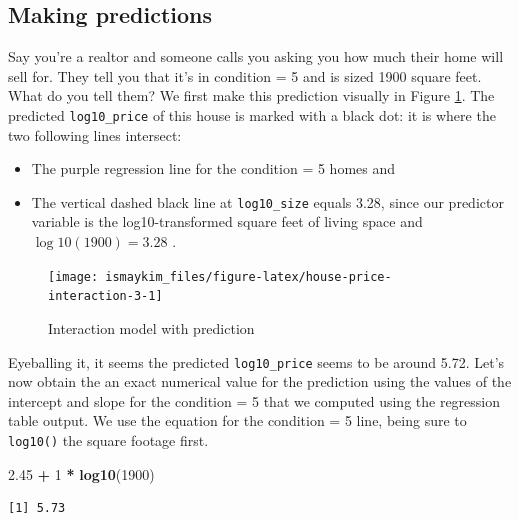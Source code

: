 \documentclass[12pt,]{krantz}
\makeatletter
\newenvironment{Shaded}{\begin{snugshade}}{\end{snugshade}}
\newcommand{\KeywordTok}[1]{\textcolor[rgb]{0.27,0.27,0.27}{\textbf{#1}}}
\newcommand{\DecValTok}[1]{\textcolor[rgb]{0.06,0.06,0.06}{#1}}
\newcommand{\FloatTok}[1]{\textcolor[rgb]{0.06,0.06,0.06}{#1}}
\newcommand{\StringTok}[1]{\textcolor[rgb]{0.5,0.5,0.5}{#1}}
\newcommand{\OperatorTok}[1]{\textcolor[rgb]{0.43,0.43,0.43}{\textbf{#1}}}
\newcommand{\NormalTok}[1]{#1}
\providecommand{\tightlist}{%
  \setlength{\itemsep}{0pt}\setlength{\parskip}{0pt}}
\newenvironment{kframe}{%
\medskip{}
\setlength{\fboxsep}{.8em}
 \def\at@end@of@kframe{}%
 \ifinner\ifhmode%
  \def\at@end@of@kframe{\end{minipage}}%
  \begin{minipage}{\columnwidth}%
 \fi\fi%
 \def\FrameCommand##1{\hskip\@totalleftmargin \hskip-\fboxsep
 \colorbox{shadecolor}{##1}\hskip-\fboxsep
     \hskip-\linewidth \hskip-\@totalleftmargin \hskip\columnwidth}%
 \MakeFramed {\advance\hsize-\width
   \@totalleftmargin\z@ \linewidth\hsize
   \@setminipage}}%
 {\par\unskip\endMakeFramed%
 \at@end@of@kframe}
\renewenvironment{Shaded}{\begin{kframe}}{\end{kframe}}
\theoremstyle{definition}
\theoremstyle{definition}
\theoremstyle{definition}
\theoremstyle{remark}
\makeatother
\begin{document}
\subsection{Making predictions}\label{house-prices-making-predictions}

Say you're a realtor and someone calls you asking you how much their
home will sell for. They tell you that it's in condition = 5 and is
sized 1900 square feet. What do you tell them? We first make this
prediction visually in Figure \ref{fig:house-price-interaction-3}. The
predicted \texttt{log10\_price} of this house is marked with a black
dot: it is where the two following lines intersect:

\begin{itemize}
\tightlist
\item
  The purple regression line for the condition = 5 homes and
\item
  The vertical dashed black line at \texttt{log10\_size} equals 3.28,
  since our predictor variable is the log10-transformed square feet of
  living space and \(\log10(1900) = 3.28\) .
\end{itemize}

\begin{figure}

{\centering \texttt{[image: ismaykim\_files/figure-latex/house-price-interaction-3-1]} 

}

\caption{Interaction model with prediction}\label{fig:house-price-interaction-3}
\end{figure}

Eyeballing it, it seems the predicted \texttt{log10\_price} seems to be
around 5.72. Let's now obtain the an exact numerical value for the
prediction using the values of the intercept and slope for the condition
= 5 that we computed using the regression table output. We use the
equation for the condition = 5 line, being sure to \texttt{log10()} the
square footage first.

\begin{Shaded}
\begin{Highlighting}[]
\FloatTok{2.45} \OperatorTok{+}\StringTok{ }\DecValTok{1} \OperatorTok{*}\StringTok{ }\KeywordTok{log10}\NormalTok{(}\DecValTok{1900}\NormalTok{)}
\end{Highlighting}
\end{Shaded}

\begin{verbatim}
[1] 5.73
\end{verbatim}
\end{document}
